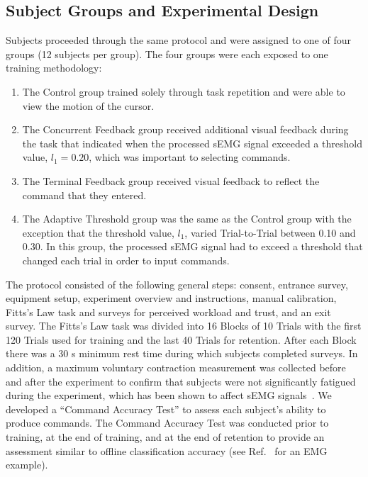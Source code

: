 \subsection{Subject Groups and Experimental Design}
Subjects proceeded through the same protocol and were assigned to one of four groups (12 subjects per group).
The four groups were each exposed to one training methodology:

\begin{enumerate}
	\item The Control group trained solely through task repetition and were able to view the motion of the cursor.
	\item The Concurrent Feedback group received additional visual feedback during the task that indicated when the processed sEMG signal exceeded a threshold value, $l_1=0.20$, which was important to selecting commands.
	\item The Terminal Feedback group received visual feedback to reflect the command that they entered.
    \item The Adaptive Threshold group was the same as the Control group with the exception that the threshold value, $l_1$, varied Trial-to-Trial between 0.10 and 0.30.
    In this group, the processed sEMG signal had to exceed a threshold that changed each trial in order to input commands.
\end{enumerate}

The protocol consisted of the following general steps: consent, entrance survey, equipment setup, experiment overview and instructions, manual calibration, Fitts's Law task and surveys for perceived workload and trust, and an exit survey.
The Fitts's Law task was divided into 16 Blocks of 10 Trials with the first 120 Trials used for training and the last 40 Trials for retention.
After each Block there was a 30 s minimum rest time during which subjects completed surveys.
In addition, a maximum voluntary contraction measurement was collected before and after the experiment to confirm that subjects were not significantly fatigued during the experiment, which has been shown to affect sEMG signals~\cite{RN47}.
We developed a ``Command Accuracy Test'' to assess each subject's ability to produce commands.
The Command Accuracy Test was conducted prior to training, at the end of training, and at the end of retention to provide an assessment similar to offline classification accuracy (see Ref.~\cite{RN48} for an EMG example).

